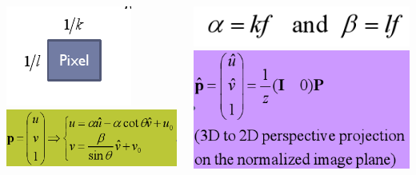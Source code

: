 \documentclass[11pt]{beamer}
\begin{document}
\begin{frame}
\begin{columns}[T] %
\begin{column}{.5\textwidth}
\includegraphics[width=.7\textwidth]{pixel_k_l.png}\vfill
\includegraphics[width=\textwidth]{p.png}
\end{column}

\begin{column}{.5\textwidth}
\includegraphics[width=\textwidth]{alpha_beta_def.png}\vfill
\includegraphics[width=\textwidth]{p_hat.png}
\end{column}
\end{columns}\vfill


\end{frame}
\end{document}
